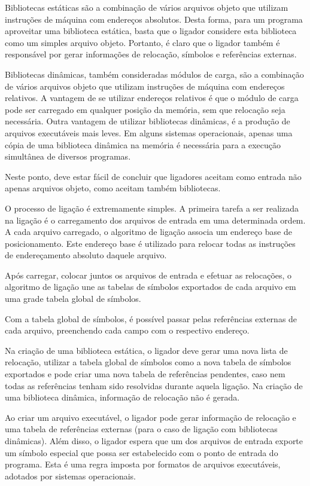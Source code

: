 Bibliotecas estáticas são a combinação de vários arquivos objeto que utilizam instruções de máquina com endereços absolutos. Desta forma, para um programa aproveitar uma biblioteca estática, basta que o ligador considere esta biblioteca como um simples arquivo objeto. Portanto, é claro que o ligador também é responsável por gerar informações de relocação, símbolos e referências externas.

Bibliotecas dinâmicas, também consideradas módulos de carga, são a combinação de vários arquivos objeto que utilizam instruções de máquina com endereços relativos. A vantagem de se utilizar endereços relativos é que o módulo de carga pode ser carregado em qualquer posição da memória, sem que relocação seja necessária. Outra vantagem de utilizar bibliotecas dinâmicas, é a produção de arquivos executáveis mais leves. Em alguns sistemas operacionais, apenas uma cópia de uma biblioteca dinâmica na memória é necessária para a execução simultânea de diversos programas.

Neste ponto, deve estar fácil de concluir que ligadores aceitam como entrada não apenas arquivos objeto, como aceitam também bibliotecas.

O processo de ligação é extremamente simples. A primeira tarefa a ser realizada na ligação é o carregamento dos arquivos de entrada em uma determinada ordem. A cada arquivo carregado, o algoritmo de ligação associa um endereço base de posicionamento. Este endereço base é utilizado para relocar todas as instruções de endereçamento absoluto daquele arquivo.

Após carregar, colocar juntos os arquivos de entrada e efetuar as relocações, o algoritmo de ligação une as tabelas de símbolos exportados de cada arquivo em uma grade tabela global de símbolos.

Com a tabela global de símbolos, é possível passar pelas referências externas de cada arquivo, preenchendo cada campo com o respectivo endereço.

Na criação de uma biblioteca estática, o ligador deve gerar uma nova lista de relocação, utilizar a tabela global de símbolos como a nova tabela de símbolos exportados e pode criar uma nova tabela de referências pendentes, caso nem todas as referências tenham sido resolvidas durante aquela ligação. Na criação de uma biblioteca dinâmica, informação de relocação não é gerada.

Ao criar um arquivo executável, o ligador pode gerar informação de relocação e uma tabela de referências externas (para o caso de ligação com bibliotecas dinâmicas). Além disso, o ligador espera que um dos arquivos de entrada exporte um símbolo especial que possa ser estabelecido com o ponto de entrada do programa. Esta é uma regra imposta por formatos de arquivos executáveis, adotados por sistemas operacionais.


